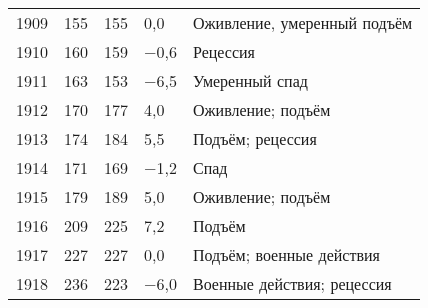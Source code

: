 \documentclass[leqno]{article}  %
\begin{document}
\begin{enumerate}[{(1)}]
\begin{table}
{\begin{tabular}{p{}|p{}|p{}|p{}|p{}}
1909 & \hfill 155 \hspace*{2.5mm} & \hfill 155 \hspace*{2.5mm} & \hfill 0,0 \hspace*{2.5mm} & Оживление, умеренный подъём\\
1910 & \hfill 160 \hspace*{2.5mm} & \hfill 159 \hspace*{2.5mm} & \hfill \(-\)0,6 \hspace*{2.5mm} & Рецессия\\
1911 & \hfill 163 \hspace*{2.5mm} & \hfill 153 \hspace*{2.5mm} & \hfill \(-\)6,5 \hspace*{2.5mm} & Умеренный спад\\
1912 & \hfill 170 \hspace*{2.5mm} & \hfill 177 \hspace*{2.5mm} & \hfill 4,0 \hspace*{2.5mm} & Оживление; подъём\\
1913 & \hfill 174 \hspace*{2.5mm} & \hfill 184 \hspace*{2.5mm} & \hfill 5,5 \hspace*{2.5mm} & Подъём; рецессия\\
1914 & \hfill 171 \hspace*{2.5mm} & \hfill 169 \hspace*{2.5mm} & \hfill \(-\)1,2 \hspace*{2.5mm} & Спад\\
1915 & \hfill 179 \hspace*{2.5mm} & \hfill 189 \hspace*{2.5mm} & \hfill 5,0 \hspace*{2.5mm} & Оживление; подъём\\
1916 & \hfill 209 \hspace*{2.5mm} & \hfill 225 \hspace*{2.5mm} & \hfill 7,2 \hspace*{2.5mm} & Подъём\\
1917 & \hfill 227 \hspace*{2.5mm} & \hfill 227 \hspace*{2.5mm} & \hfill 0,0 \hspace*{2.5mm} & Подъём; военные действия\\
1918 & \hfill 236 \hspace*{2.5mm} & \hfill 223 \hspace*{2.5mm} & \hfill \(-\)6,0 \hspace*{2.5mm} & Военные действия; рецессия\\

\end{tabular}}
\end{table}
\end{enumerate}
\end{document}
